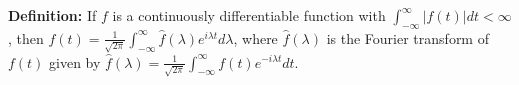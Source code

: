 {\bf Definition:} If $f$ is a continuously differentiable function with $\int_{-\infty}^{\infty}|f(t)|dt<\infty$, then $f(t)=\frac{1}{\sqrt{2\pi}}\int_{-\infty}^{\infty}\hat{f}(\lambda)e^{i\lambda t}d\lambda$, where $\hat{f}(\lambda)$ is the Fourier transform of $f(t)$ given by $\hat{f}(\lambda)=\frac{1}{\sqrt{2\pi}}\int_{-\infty}^{\infty}f(t)e^{-i\lambda t}dt$.